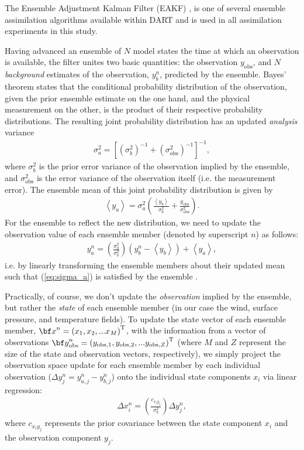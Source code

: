 The Ensemble Adjustment Kalman Filter (EAKF) \citep{anderson2001}, is one of several ensemble assimilation algorithms available within DART and is used in all assimilation experiments in this study. 

Having advanced an ensemble of $N$ model states the time at which an observation is available, 
the filter unites two basic quantities: the observation $y_{\text{obs}}$, and $N$ \textit{background} estimates of the observation, $y_{b}^{n}$, predicted by the ensemble. 
Bayes' theorem states that the conditional probability distribution of the observation, given the prior ensemble estimate on the one hand, and the physical measurement on the other, is the product of their respective probability distributions.
The resulting joint probability distribution has an updated \textit{analysis} variance 
\begin{eqnarray}
 \sigma_a^2 = 
\left[
\left( \sigma_b^2  \right)^{-1}+
\left( \sigma_{\text{obs}}^2  \right)^{-1}
\right]^{-1},
\label{eq:sigma_a}
\end{eqnarray}
where $\sigma_b^2$ is  the prior error variance of the observation implied by the ensemble, and $\sigma_{\text{obs}}^2$ is the error variance of the observation itself (i.e. the measurement error).
The ensemble mean of this joint probability distribution is given by
\begin{eqnarray}
\left< y_a \right> = \sigma_a^2 
\left(
\frac{\left< y_b \right>}{\sigma_b^2} +
\frac{y_{\text{obs}} }{\sigma_{\text{obs}}^2} 
\right).
\end{eqnarray}
For the ensemble to reflect the new distribution, we need to update the observation value of each ensemble member (denoted by superscript $n$) as follows:
\begin{eqnarray}
 y_{a}^n = 
\left( \frac{\sigma_a^2}{\sigma_b^2}  \right)
\left(
y_{b}^n - \left< y_b  \right> \right)
+ \left< y_a \right>,
\end{eqnarray}
i.e. by linearly transforming the ensemble members about their updated mean such that (\ref{eq:sigma_a}) is satisfied by the ensemble \citep{andersoncollins2006}.

Practically, of course, we don't update the \textit{observation} implied by the ensemble, but rather the \textit{state} of each ensemble member (in our case the wind, surface pressure, and temperature fields). 
To update the state vector of each ensemble member, ${\bf x}^n = \left(x_1,x_2,...x_M  \right)^{\text{T}}$, with the information from a vector of observations ${\bf y}_{\text{obs}}^n = \left(y_{\text{obs},1},y_{\text{obs},2},...y_{\text{obs},Z}  \right)^{\text{T}}$ (where $M$ and $Z$ represent the size of the state and observation vectors, respectively), we simply project the observation space update for each ensemble member by each individual observation ($\Delta y^n_j = y_{a,j}^n-y_{b,j}^n$) onto the individual state components $x_i$ via linear regression:
\begin{eqnarray}
 \Delta x_{i}^n = 
\left(
\frac{c_{x_iy_j}}{\sigma_b^2}
\right)
\Delta y^n_j,
\label{eq:state_update}
\end{eqnarray}
where $c_{x_iy_j}$ represents the prior covariance between the state component $x_i$ and the observation component $y_j$.

